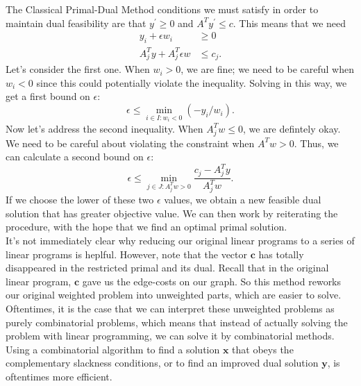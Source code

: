 \documentclass[11pt]{article}
\renewcommand{\'}{^{'}}
\begin{document}
\begin{section}{The Classical Primal-Dual Method}
	conditions we must satisfy in order to maintain dual feasibility are that $y^{'} \geq 0$ and 
	$A^{T}y^{'} \leq c$. This means that we need 
	\begin{align}
		y_i + \epsilon w_i &\geq 0 \\
		A^{T}_j y + A^T_j \epsilon w & \leq c_j.
	\end{align}
	Let's consider the first one. When $w_i > 0$, we are fine; we need to be careful when 
	$w_i < 0$ since this could potentially violate the inequality. Solving in this way, we get 
	a first bound on $\epsilon$:
	\[
		\epsilon \leq \min_{i\in I: w_i < 0} (-y_i/w_i).
	\]
	Now let's address the second inequality. When $A^{T}_jw \leq 0$, we are defintely okay. We 
	need to be careful about violating the constraint when $A^{T}w > 0$. Thus, we can calculate a 
	second bound on $\epsilon$:
	\[
		\epsilon \leq \min_{j\in J: A^{T}_jw > 0} \frac{c_j-A^{T}_jy}{A^{T}_j w}.
	\]
	If we choose the lower of these two $\epsilon$ values, we obtain a new feasible dual solution 
	that has greater objective value. We can then work by reiterating the procedure, with the hope 
	that we find an optimal primal solution.\\
	It's not immediately clear why reducing our original linear programs to a series of linear 
	programs is heplful. However,  note that the vector $\mathbf{c}$ has totally disappeared in 
	the restricted primal and its dual. Recall that in the original linear program, $\mathbf{c}$ 
	gave us the edge-costs on our graph. So this method reworks our original weighted problem 
	into unweighted parts, which are easier to solve. Oftentimes, it is the case that 
	we can interpret these unweighted problems as purely combinatorial problems, which means that 
	instead of actually solving the problem with linear programming, we can solve it by 
	combinatorial 
	methods. Using a combinatorial algorithm to find a solution $\mathbf{x}$ that obeys the 
	complementary slackness conditions, or to find an improved dual solution $\mathbf{y}$, is 
	oftentimes more efficient.
\end{section}
	
\end{document}
